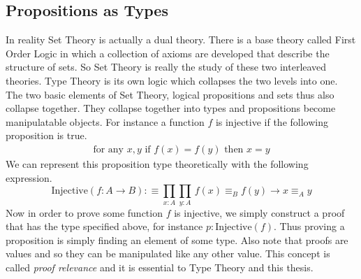 \documentclass[./Thesis.tex]{subfiles}
\begin{document}
\subsection{Propositions as Types}
In reality Set Theory is actually a dual theory. There is a base theory called
First Order Logic in which a collection of axioms are developed that describe
the structure of sets. So Set Theory is really the study of these two
interleaved theories. Type Theory is its own logic which collapses the two
levels into one. The two basic elements of Set Theory, logical propositions and
sets thus also collapse together. They collapse together into types and
propositions become manipulatable objects. For instance
a function $f$ is injective if the following proposition is true.
\begin{align}
  \text{for any } x, y \text{ if } f(x) = f(y) \text{ then } x = y
\end{align}
We can represent this proposition type theoretically with the following
expression. 
\begin{equation}
  \label{eqn:injective}
  \text{Injective}(f : A \to B) :\equiv \prod_{x : A} \prod_{y : A} \, f(x) \equiv_B f(y) \to x \equiv_A y
\end{equation}
Now in order to prove some function $f$ is injective, we simply construct a proof
that has the type specified above, for instance $p : \text{Injective}(f)$.
Thus proving a proposition is simply finding an element of some type.
Also note that proofs are values and so they can be
manipulated like any other value. This concept is called
\textit{proof relevance} and it is essential to Type Theory and this thesis.
\end{document}
